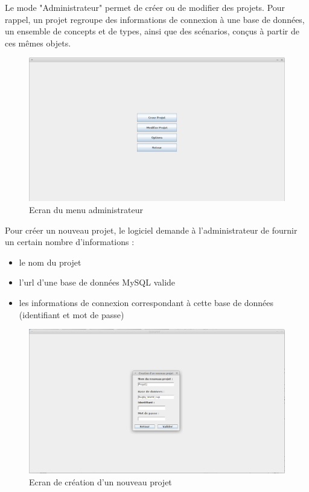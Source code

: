 \documentclass[12pt]{report}
\begin{document}
\bigskip 

Le mode "Administrateur" permet de créer ou de modifier des projets. Pour rappel, un projet regroupe des informations de connexion à une base de données, un ensemble de concepts et de types, ainsi que des scénarios, conçus à partir de ces mêmes objets.



\begin{figure}[h!]
\centering
\includegraphics[scale=0.3]{IHM/selection_projet.png}
\caption{Ecran du menu administrateur}
\end{figure}

Pour créer un nouveau projet, le logiciel demande à l'administrateur de fournir un certain nombre d'informations : 
\begin{itemize}
\item le nom du projet
\item l'url d'une base de données MySQL valide
\item les informations de connexion correspondant à cette base de données (identifiant et mot de passe)
\end{itemize}

\begin{figure}[h!]
\centering
\includegraphics[scale=0.3]{IHM/creation_projet.png}
\caption{Ecran de création d'un nouveau projet}
\end{figure}
\end{document}
